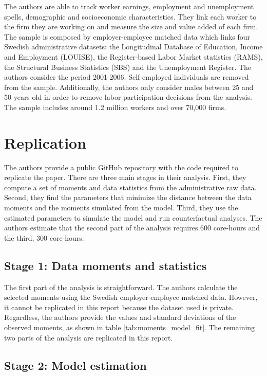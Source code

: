 \documentclass{article}
\begin{document}
The authors are able to track worker earnings, employment and unemployment spells, demographic and socioeconomic characteristics. They link each worker to the firm they are working on and measure the size and value added of each firm. The sample is composed by employer-employee matched data which links four Swedish administrative datasets: the Longitudinal Database of Education, Income and Employment (LOUISE), the Register-based Labor Market statistics (RAMS), the Structural Business Statistics (SBS) and the Unemployment Register. The authors consider the period 2001-2006. Self-employed individuals are removed from the sample. Additionally, the authors only consider males between 25 and 50 years old in order to remove labor participation decisions from the analysis. The sample includes around 1.2 million workers and over 70,000 firms.


\section{Replication}

The authors provide a public GitHub repository with the code required to replicate the paper. There are three main stages in their analysis. First, they compute a set of moments and data statistics from the administrative raw data. Second, they find the parameters that minimize the distance between the data moments and the moments simulated from the model. Third, they use the estimated parameters to simulate the model and run counterfactual analyses. The authors estimate that the second part of the analysis requires 600 core-hours and the third, 300 core-hours. 

\subsection{Stage 1: Data moments and statistics}

The first part of the analysis is straightforward. The authors calculate the selected moments using the Swedish employer-employee matched data. However, it cannot be replicated in this report because the dataset used is private. Regardless, the authors provide the values and standard deviations of the observed moments, as shown in table \ref{tab:moments_model_fit}. The remaining two parts of the analysis are replicated in this report.


\subsection{Stage 2: Model estimation}
\end{document}
